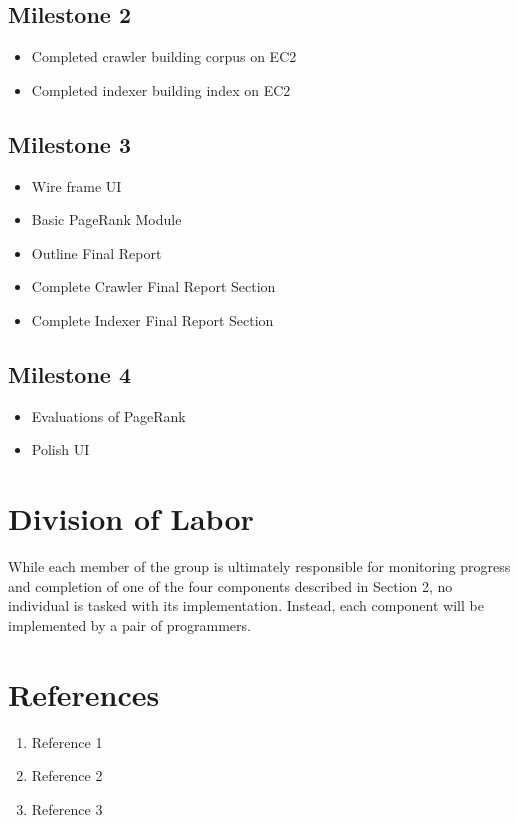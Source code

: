 \documentclass[11pt, onecolumn]{article}
\begin{document}
\subsection{Milestone 2}

\begin{itemize}
\item            Completed crawler building corpus on EC2
\item            Completed indexer building index on EC2
\end{itemize}


\subsection{Milestone 3}

\begin{itemize}
\item            Wire frame UI
\item            Basic PageRank Module
\item            Outline Final Report
\item            Complete Crawler Final Report Section
\item            Complete Indexer Final Report Section
\end{itemize}


\subsection{Milestone 4}

\begin{itemize}
\item            Evaluations of PageRank
\item            Polish UI
\end{itemize}


\section{ Division of Labor }

While each member of the group is ultimately responsible for monitoring progress and completion of  one of the four components described in Section 2, no individual is tasked with its implementation.  Instead, each component will be implemented by a pair of programmers.  



\section{References}

\begin{enumerate}
\item Reference 1
\item Reference 2
\item Reference 3
\end{enumerate}
\end{document}
